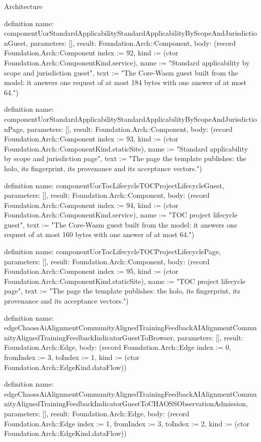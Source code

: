 \begin{lexlean}{Architecture}
\begin{semanticmodule}
definition{
  name: componentUorStandardApplicabilityStandardApplicabilityByScopeAndJurisdictionGuest,
  parameters: [],
  result: Foundation.Arch::Component,
  body: (record Foundation.Arch::Component {index := 92, kind := (ctor Foundation.Arch::ComponentKind.service), name := "Standard applicability by scope and jurisdiction guest", text := "The Core-Wasm guest built from the model: it answers one request of at most 184 bytes with one answer of at most 64."})
}

definition{
  name: componentUorStandardApplicabilityStandardApplicabilityByScopeAndJurisdictionPage,
  parameters: [],
  result: Foundation.Arch::Component,
  body: (record Foundation.Arch::Component {index := 93, kind := (ctor Foundation.Arch::ComponentKind.staticSite), name := "Standard applicability by scope and jurisdiction page", text := "The page the template publishes: the holo, its fingerprint, its provenance and its acceptance vectors."})
}

definition{
  name: componentUorTocLifecycleTOCProjectLifecycleGuest,
  parameters: [],
  result: Foundation.Arch::Component,
  body: (record Foundation.Arch::Component {index := 94, kind := (ctor Foundation.Arch::ComponentKind.service), name := "TOC project lifecycle guest", text := "The Core-Wasm guest built from the model: it answers one request of at most 160 bytes with one answer of at most 64."})
}

definition{
  name: componentUorTocLifecycleTOCProjectLifecyclePage,
  parameters: [],
  result: Foundation.Arch::Component,
  body: (record Foundation.Arch::Component {index := 95, kind := (ctor Foundation.Arch::ComponentKind.staticSite), name := "TOC project lifecycle page", text := "The page the template publishes: the holo, its fingerprint, its provenance and its acceptance vectors."})
}

definition{
  name: edgeChaossAiAlignmentCommunityAlignedTrainingFeedbackAIAlignmentCommunityAlignedTrainingFeedbackIndicatorGuestToBrowser,
  parameters: [],
  result: Foundation.Arch::Edge,
  body: (record Foundation.Arch::Edge {index := 0, fromIndex := 3, toIndex := 1, kind := (ctor Foundation.Arch::EdgeKind.dataFlow)})
}

definition{
  name: edgeChaossAiAlignmentCommunityAlignedTrainingFeedbackAIAlignmentCommunityAlignedTrainingFeedbackIndicatorGuestToCHAOSSObservationAdmission,
  parameters: [],
  result: Foundation.Arch::Edge,
  body: (record Foundation.Arch::Edge {index := 1, fromIndex := 3, toIndex := 2, kind := (ctor Foundation.Arch::EdgeKind.dataFlow)})
}


\end{semanticmodule}
\end{lexlean}
